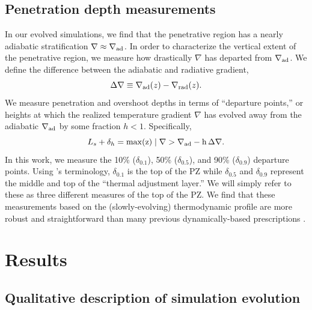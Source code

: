 \documentclass{aastex631}
\newcommand{\gradrad}{\ensuremath{\nabla_{\rm{rad}}}}
\newcommand{\gradad}{\ensuremath{\nabla_{\rm{ad}}}}
\newcommand{\justgrad}{\ensuremath{\nabla}}
\begin{document}
\subsection{Penetration depth measurements}
In our evolved simulations, we find that the penetrative region has a nearly adiabatic stratification $\justgrad \approx \gradad$.
In order to characterize the vertical extent of the penetrative region, we measure how drastically $\justgrad$ has departed from $\gradad$.
We define the difference between the adiabatic and radiative gradient,
\begin{equation}
\Delta\justgrad \equiv \gradad(z) - \gradrad(z).
\end{equation}
We measure penetration and overshoot depths in terms of ``departure points,'' or heights at which the realized temperature gradient $\justgrad$ has evolved away from the adiabatic $\gradad$ by some fraction $h < 1$.
Specifically,
\begin{equation}
L_s + \delta_{h} = \rm{max}(z) \mid \justgrad > \gradad - h\,\Delta\justgrad.
\label{eqn:delta_p_measures}
\end{equation}
In this work, we measure the 10\% ($\delta_{0.1}$), 50\% ($\delta_{0.5}$), and 90\% ($\delta_{0.9}$) departure points.
Using \citet{zahn1991}'s terminology, $\delta_{0.1}$ is the top of the PZ while $\delta_{0.5}$ and $\delta_{0.9}$ represent the middle and top of the ``thermal adjustment layer.''
We will simply refer to these as three different measures of the top of the PZ.
We find that these measurements based on the (slowly-evolving) thermodynamic profile are more robust and straightforward than many previous dynamically-based prescriptions \citep[see e.g.,][for a nice discussion]{pratt_etal_2017}.

\section{Results}
\label{sec:results}

\subsection{Qualitative description of simulation evolution}
\end{document}
